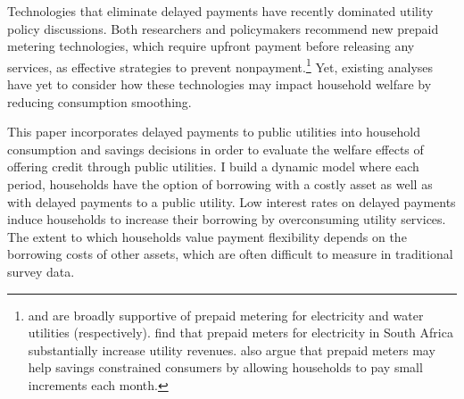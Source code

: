 \documentclass[12pt]{article}
\begin{document}
Technologies that eliminate delayed payments have recently dominated utility policy discussions.    Both researchers and policymakers recommend new prepaid metering technologies, which require upfront payment before releasing any services, as effective strategies to prevent nonpayment.\footnote{\cite{kojima2016making} and \cite{heymans2014limits} are broadly supportive of prepaid metering for electricity and water utilities (respectively).  \cite{jack2016charging} find that prepaid meters for electricity in South Africa substantially increase utility revenues.  \cite{jack2015pay} also argue that prepaid meters may help savings constrained consumers by allowing households to pay small increments each month.}    Yet, existing analyses have yet to consider how these technologies may impact household welfare by reducing consumption smoothing.





This paper incorporates delayed payments to public utilities into household consumption and savings decisions in order to evaluate the welfare effects of offering credit through public utilities.  I build a dynamic model where each period, households have the option of borrowing with a costly asset as well as with delayed payments to a public utility.  Low interest rates on delayed payments induce households to increase their borrowing by overconsuming utility services.  The extent to which households value payment flexibility depends on the borrowing costs of other assets, which are often difficult to measure in traditional survey data. %
\end{document}
